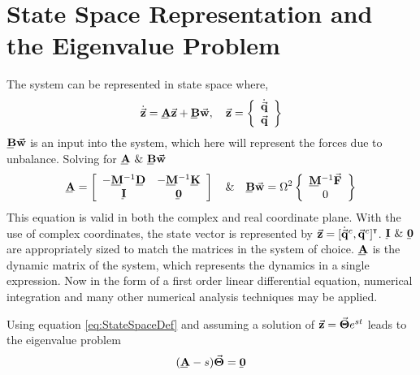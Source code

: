\section{State Space Representation and the Eigenvalue Problem}
The system can be represented in state space where,
\begin{equation}\label{eq:StateSpaceDef}
\dot{\vec{\mathbf{z}}}=\bunderline{\mathbf{A}}\vec{\mathbf{z}}+\bunderline{\mathbf{B}}\vec{\mathbf{w}},\quad\vec{\mathbf{z}}=\left\{\begin{array}{c}\dot{\vec{\mathbf{q}}}\\\vec{\mathbf{q}}\end{array}\right\}
\end{equation}
$ \bunderline{\mathbf{B}}\vec{\mathbf{w}} $ is an input into the system, which here will represent the forces due to unbalance. Solving for $ \bunderline{\mathbf{A}}\  \&\   \bunderline{\mathbf{B}}\vec{\mathbf{w}}$
\begin{equation}\label{key}
\bunderline{\mathbf{A}}=\left[\begin{array}{cc}
-\bunderline{\mathbf{M}}^{-1}\bunderline{\mathbf{D}}&-\bunderline{\mathbf{M}}^{-1}\bunderline{\mathbf{K}}\\
\bunderline{\mathbf{I}}&\bunderline{\mathbf{0}}
\end{array}\right]\quad\&\quad\bunderline{\mathbf{B}}\vec{\mathbf{w}}=\Omega^2\left\{\begin{array}{c}
\mat{M}^{-1}\vec{\mathbf{F}}\\0\end{array}\right\}
\end{equation}
This equation is valid in both the complex and real coordinate plane. With the use of complex coordinates, the state vector is represented by $ \vec{\mathbf{z}}=[\dot{\vec{\mathbf{q}}}^c,\vec{\mathbf{q}}^c]^{\textbf{{\tiny \textsf{T}}}} $. $ \bunderline{\mathbf{I}}\ \&\ \bunderline{\mathbf{0}} $ are appropriately sized to match the matrices in the system of choice. $ \mat{A} $ is the dynamic matrix of the system, which represents the dynamics in a single expression. Now in the form of a first order linear differential equation, numerical integration and many other numerical analysis techniques may be applied.\par
Using equation \eqref{eq:StateSpaceDef} and assuming a solution of $ \vec{\mathbf{z}}=\vec{\mathbf{\Theta}}e^{st} $ leads to the eigenvalue problem
\begin{equation}\label{eq:StateSpaceEigenValueProblem}
(\mat{A}-s)\vect{\Theta}=\mat{0}
\end{equation} 
